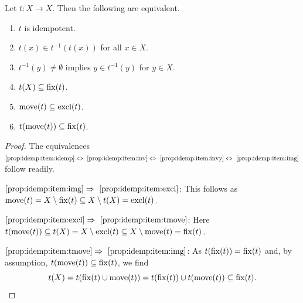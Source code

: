 \begin{proposition}\label{prelim:prop:idempotent}
	Let $t \colon X \to X$. Then the following are equivalent.
	\begin{enumerate}
		\item \label{prop:idemp:item:idemp} $t$ is idempotent.
		
		\item \label{prop:idemp:item:inv} $t(x) \in t^{-1}(t(x))$ for all $x \in X$.
		
		\item \label{prop:idemp:item:invy} $t^{-1}(y) \ne \emptyset$ implies $y \in t^{-1}(y)$ for $y \in X$.
		
		\item \label{prop:idemp:item:img} $t(X) \subseteq \operatorname{fix}(t)$.
		
		\item \label{prop:idemp:item:excl} $\operatorname{move}(t) \subseteq \operatorname{excl}(t)$. 		
		
		\item \label{prop:idemp:item:tmove}  $t(\operatorname{move}(t)) \subseteq \operatorname{fix}(t)$.			
	\end{enumerate}
\end{proposition}
\begin{proof}
	The equivalences $\ref{prop:idemp:item:idemp} \Leftrightarrow~\ref{prop:idemp:item:inv} 
	\Leftrightarrow~\ref{prop:idemp:item:invy}\Leftrightarrow~\ref{prop:idemp:item:img}$ follow readily.
	
	$\ref{prop:idemp:item:img} \Rightarrow~\ref{prop:idemp:item:excl}$: 
	This follows as $\operatorname{move}(t) = X \setminus \operatorname{fix}(t) \subseteq X \setminus t(X) =  \operatorname{excl}(t)$.
	
	$\ref{prop:idemp:item:excl} \Rightarrow~\ref{prop:idemp:item:tmove}$:
	Here $t(\operatorname{move}(t)) \subseteq t(X) = X \setminus \operatorname{excl}(t) \subseteq X \setminus \operatorname{move}(t) = \operatorname{fix}(t)$.
	
	$\ref{prop:idemp:item:tmove} \Rightarrow~\ref{prop:idemp:item:img}$: As $t(\operatorname{fix}(t)) = \operatorname{fix}(t)$
	and, by assumption, $t(\operatorname{move}(t)) \subseteq \operatorname{fix}(t)$,
	we find 
	\[
	t(X) = t(\operatorname{fix}(t) \cup \operatorname{move}(t)) = t(\operatorname{fix}(t)) \cup t(\operatorname{move}(t)) \subseteq \operatorname{fix}(t).
	\]
\end{proof} 

